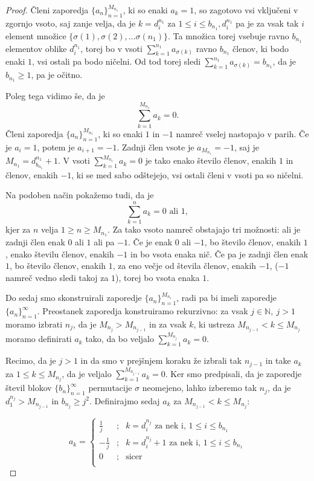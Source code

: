 \documentclass[12pt,a4paper,reqno]{amsart}
\theoremstyle{definition} %
\theoremstyle{plain} %
\newcommand{\N}{\mathbb N}
\begin{document}
\begin{proof}
Členi zaporedja $\{a_n\}^{M_{n_1}}_{n=1}$, ki so enaki $a_k=1$, so zagotovo vsi vključeni v zgornjo vsoto, saj zanje velja, da je $k=d_i^{n_1}$ za $1\leq i\leq b_{n_1}, d_i^{n_1}$ pa je za vsak tak $i$ element množice $\{ \sigma (1), \sigma (2), \ldots \sigma (n_1) \}$. Ta množica torej vsebuje ravno $b_{n_1}$ elementov oblike $d_i^{n_1}$, torej bo v vsoti $\sum_{k=1}^{n_1}a_{\sigma(k)}$ ravno $b_{n_1}$ členov, ki bodo enaki $1$, vsi ostali pa bodo ničelni. Od tod torej sledi $\sum_{k=1}^{n_1}a_{\sigma(k)}=b_{n_1}$, da je $b_{n_1}\geq 1$, pa je očitno.

Poleg tega vidimo še, da je $$\sum_{k=1}^{M_{n_1}}a_k=0.$$ Členi zaporedja $\{a_n\}^{M_{n_1}}_{n=1}$, ki so enaki $1$ in $-1$ namreč vselej nastopajo v parih. Če je $a_i=1$, potem je $a_{i+1}=-1$. Zadnji člen vsote je $a_{M_{n_1}}=-1$, saj je $M_{n_1}=d_{b_{n_1}}^{n_1}+1$. V vsoti $\sum_{k=1}^{M_{n_1}}a_k=0$ je tako enako število členov, enakih $1$ in členov, enakih $-1$, ki se med sabo odštejejo, vsi ostali členi v vsoti pa so ničelni.

Na podoben način pokažemo tudi, da je $$\sum_{k=1}^{n}a_k=0\textrm{ ali }1,$$ kjer za $n$ velja $1\geq n\geq M_{n_1}$. Za tako vsoto namreč obstajajo tri možnosti: ali je zadnji člen enak $0$ ali $1$ ali pa $-1$. Če je enak $0$ ali $-1$, bo število členov, enakih $1$, enako številu členov, enakih $-1$ in bo vsota enaka nič. Če pa je zadnji člen enak $1$, bo število členov, enakih $1$, za eno večje od števila členov, enakih $-1$, ($-1$ namreč vedno sledi takoj za $1$), torej bo vsota enaka $1$.

Do sedaj smo skonstruirali zaporedje $\{a_n\}^{M_{n_1}}_{n=1}$, radi pa bi imeli zaporedje $\{a_n\}^{\infty}_{n=1}$. Preostanek zaporedja konstruiramo rekurzivno: za vsak $j\in \N,\ j>1$ moramo izbrati $n_j$, da je $M_{n_j}>M_{n_{j-1}}$ in za vsak $k$, ki ustreza $M_{n_{j-1}}<k\leq M_{n_j}$ moramo definirati $a_k$ tako, da bo veljalo $\sum_{k=1}^{M_{n_j}}a_k=0$.

Recimo, da je $j>1$ in da smo v prejšnjem koraku že izbrali tak $n_{j-1}$ in take $a_k$ za $1\leq k\leq M_{n_j}$, da je veljalo $\sum_{k=1}^{M_{n_{j-1}}}a_k=0$. Ker smo predpisali, da je zaporedje števil blokov $\{b_n\}^{\infty}_{n=1}$ permutacije $\sigma$ neomejeno, lahko izberemo tak $n_j$, da je $d_1^{n_j}>M_{n_{j-1}}$ in $b_{n_j}\geq j^2$. %
Definirajmo sedaj $a_k$ za $M_{n_{j-1}}<k\leq M_{n_j}$:

$$a_k = 
\left\{ 
\begin{array}{ccc}
\frac{1}{j}&;&k=d_i^{n_j}\textrm{ za nek i, }1\leq i \leq b_{n_1}\\
-\frac{1}{j}&;&k=d_i^{n_j}+1\textrm{ za nek i, }1\leq i \leq b_{n_1}\\
0&;&\textrm{sicer}\\
\end{array}
\right. 
$$


\end{proof}
\end{document}
